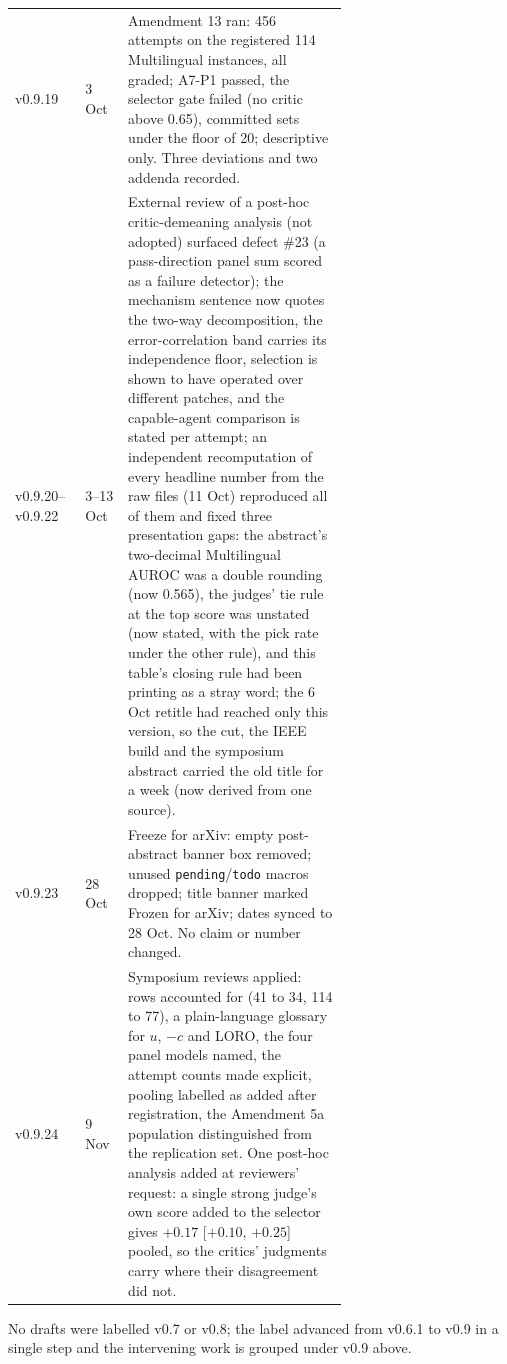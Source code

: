 \documentclass[11pt]{article}
\begin{document}
\begin{longtable}{@{}llp{0.66\linewidth}@{}}
v0.9.19 & 3 Oct & Amendment 13 ran: 456 attempts on the registered 114 Multilingual instances, all graded; A7-P1 passed, the selector gate failed (no critic above 0.65), committed sets under the floor of 20; descriptive only. Three deviations and two addenda recorded. \\
v0.9.20--v0.9.22 & 3--13 Oct & External review of a post-hoc critic-demeaning analysis (not adopted) surfaced defect \#23 (a pass-direction panel sum scored as a failure detector); the mechanism sentence now quotes the two-way decomposition, the error-correlation band carries its independence floor, selection is shown to have operated over different patches, and the capable-agent comparison is stated per attempt; an independent recomputation of every headline number from the raw files (11 Oct) reproduced all of them and fixed three presentation gaps: the abstract's two-decimal Multilingual AUROC was a double rounding (now 0.565), the judges' tie rule at the top score was unstated (now stated, with the pick rate under the other rule), and this table's closing rule had been printing as a stray word; the 6 Oct retitle had reached only this version, so the cut, the IEEE build and the symposium abstract carried the old title for a week (now derived from one source). \\
v0.9.23 & 28 Oct & Freeze for arXiv: empty post-abstract banner box removed; unused \texttt{pending}/\texttt{todo} macros dropped; title banner marked Frozen for arXiv; dates synced to 28 Oct. No claim or number changed. \\
v0.9.24 & 9 Nov & Symposium reviews applied: rows accounted for (41 to 34, 114 to 77), a plain-language glossary for $u$, $-c$ and LORO, the four panel models named, the attempt counts made explicit, pooling labelled as added after registration, the Amendment 5a population distinguished from the replication set. One post-hoc analysis added at reviewers' request: a single strong judge's own score added to the selector gives $+0.17$ [$+0.10$, $+0.25$] pooled, so the critics' judgments carry where their disagreement did not. \\\bottomrule
\end{longtable}

\medskip
No drafts were labelled v0.7 or v0.8; the label advanced from v0.6.1 to v0.9 in a single step and the intervening work is grouped under v0.9 above.
\normalsize
\end{document}
